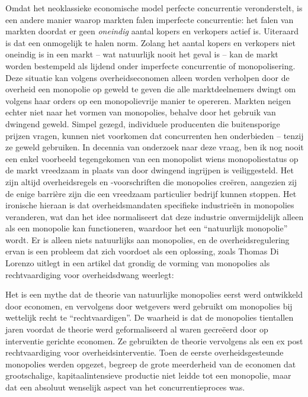 Omdat het neoklassieke economische model perfecte concurrentie veronderstelt, is een andere manier waarop markten falen imperfecte concurrentie: het falen van markten doordat er geen \textit{oneindig} aantal kopers en verkopers actief is. Uiteraard is dat een onmogelijk te halen norm. Zolang het aantal kopers en verkopers niet oneindig is in een markt -- wat natuurlijk nooit het geval is -- kan de markt worden bestempeld als lijdend onder imperfecte concurrentie of monopolisering. Deze situatie kan volgens overheidseconomen alleen worden verholpen door de overheid een monopolie op geweld te geven die alle marktdeelnemers dwingt om volgens haar orders op een monopolievrije manier te opereren. Markten neigen echter niet naar het vormen van monopolies, behalve door het gebruik van dwingend geweld. Simpel gezegd, individuele producenten die buitensporige prijzen vragen, kunnen niet voorkomen dat concurrenten hen onderbieden -- tenzij ze geweld gebruiken. In decennia van onderzoek naar deze vraag, ben ik nog nooit een enkel voorbeeld tegengekomen van een monopolist wiens monopoliestatus op de markt vreedzaam in plaats van door dwingend ingrijpen is veiliggesteld. Het zijn altijd overheidsregels en -voorschriften die monopolies creëren, aangezien zij de enige barrière zijn die een vreedzaam particulier bedrijf kunnen stoppen. Het ironische hieraan is dat overheidsmandaten specifieke industrieën in monopolies veranderen, wat dan het idee normaliseert dat deze industrie onvermijdelijk alleen als een monopolie kan functioneren, waardoor het een ``natuurlijk monopolie'' wordt. Er is alleen niets natuurlijks aan monopolies, en de overheidsregulering ervan is een probleem dat zich voordoet als een oplossing, zoals Thomas Di Lorenzo uitlegt in een artikel dat grondig de vorming van monopolies als rechtvaardiging voor overheidsdwang weerlegt:\autocite{186}

\begin{blockquotebox}
Het is een mythe dat de theorie van natuurlijke monopolies eerst werd ontwikkeld door economen, en vervolgens door wetgevers werd gebruikt om monopolies bij wettelijk recht te ``rechtvaardigen''. De waarheid is dat de monopolies tientallen jaren voordat de theorie werd geformaliseerd al waren gecreëerd door op interventie gerichte economen. Ze gebruikten de theorie vervolgens als een ex post rechtvaardiging voor overheidsinterventie. Toen de eerste overheidsgesteunde monopolies werden opgezet, begreep de grote meerderheid van de economen dat grootschalige, kapitaalintensieve productie niet leidde tot een monopolie, maar dat een absoluut wenselijk aspect van het concurrentieproces was.
\end{blockquotebox}

